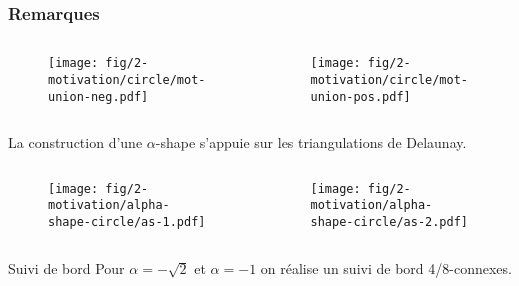 \begin{frame}
  \frametitle{Remarques}
  {
    \begin{columns}[t]
      \begin{column}{5cm}
        \begin{figure}[h!]
          \centering
          \texttt{[image: fig/2-motivation/circle/mot-union-neg.pdf]}
         \end{figure}
       \end{column}
       \begin{column}{5cm}
         \begin{figure}[h!]
           \centering
           \texttt{[image: fig/2-motivation/circle/mot-union-pos.pdf]}
         \end{figure}
       \end{column}
    \end{columns}
    
    \begin{block}{}
      La construction d'une $\alpha$-shape s'appuie sur les triangulations de Delaunay.    
    \end{block}
  }
  {
    \begin{columns}[t]
      \begin{column}{5cm}
        \begin{figure}[h!]
          \centering
          \texttt{[image: fig/2-motivation/alpha-shape-circle/as-1.pdf]}
         \end{figure}
       \end{column}
       \begin{column}{5cm}
         \begin{figure}[h!]
           \centering
           \texttt{[image: fig/2-motivation/alpha-shape-circle/as-2.pdf]}
         \end{figure}
       \end{column}
    \end{columns}
    
    \begin{block}{Suivi de bord}
      Pour $\alpha = -\sqrt{2}$ et $\alpha = -1$ on réalise un suivi de bord 4/8-connexes.   
    \end{block}
  }
\end{frame}

